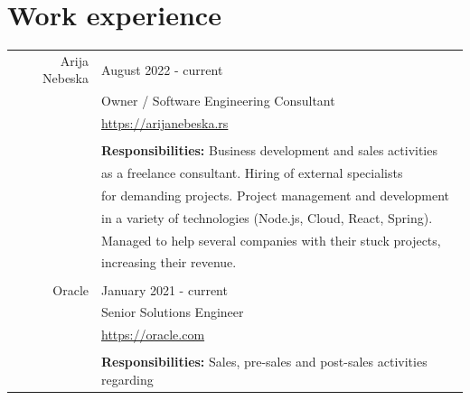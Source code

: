 \documentclass[a4paper]{article}
\begin{document}
\pagebreak

\section{Work experience}
\begin{longtable}{@{}r | l}
    Arija Nebeska  & August 2022 - current                                                                 \\
                   & Owner / Software Engineering Consultant                                               \\
                   & \href{https://arijanebeska.rs}{https://arijanebeska.rs}                               \\
                   &                                                                                       \\
                   & \textbf{Responsibilities:} Business development and sales activities                  \\
                   & as a freelance consultant. Hiring of external specialists                             \\
                   & for demanding projects. Project management and development                            \\
                   & in a variety of technologies (Node.js, Cloud, React, Spring).                         \\
                   & Managed to help several companies with their stuck projects,                          \\
                   & increasing their revenue.                                                             \\
                   &                                                                                       \\
    Oracle         & January 2021 - current                                                                \\
                   & Senior Solutions Engineer                                                             \\
                   & \href{https://oracle.com}{https://oracle.com}                                         \\
                   &                                                                                       \\
                   & \textbf{Responsibilities:} Sales, pre-sales and post-sales activities regarding       \\

\end{longtable}
\end{document}
